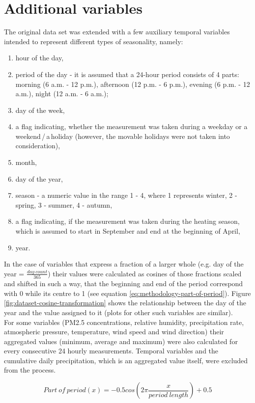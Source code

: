\section{Additional variables}\label{sec:additional-variables}
The original data set was extended with a few auxiliary temporal variables intended to represent different types of seasonality, namely:
\begin{enumerate}
    \item hour of the day,
    \item period of the day - it is assumed that a 24-hour period consists of 4 parts: morning (6 a.m. - 12 p.m.), afternoon (12 p.m. - 6 p.m.), evening (6 p.m. - 12 a.m.), night (12 a.m. - 6 a.m.);
    \item day of the week,
    \item a flag indicating, whether the measurement was taken during a weekday or a weekend\,/\,a\,holiday (however, the movable holidays were not taken into consideration),
    \item month,
    \item day of the year,
    \item season - a numeric value in the range 1 - 4, where 1 represents winter, 2 - spring, 3 - summer, 4 - autumn,
    \item a flag indicating, if the measurement was taken during the heating season, which is assumed to start in September and end at the beginning of April,
    \item year.
\end{enumerate}
In the case of variables that express a fraction of a larger whole (e.g. day of the year = $\frac{day\  count}{365}$) their values were calculated as cosines of those fractions scaled and shifted in such a way, that the beginning and end of the period correspond with 0 while its centre to 1 (see equation \ref{eq:methodology-part-of-period}). Figure \ref{fig:dataset-cosine-transformation} shows the relationship between the day of the year and the value assigned to it (plots for other such variables are similar).
\\
For some variables (PM2.5 concentrations, relative humidity, precipitation rate, atmospheric pressure, temperature, wind speed and wind direction) their aggregated values (minimum, average and maximum) were also calculated for every consecutive 24 hourly measurements. Temporal variables and the cumulative daily precipitation, which is an aggregated value itself, were excluded from the process.

\begin{equation} \label{eq:methodology-part-of-period}
{Part\ of\ period}(x) = -0.5 cos(2 \pi \frac{x}{period\ length}) + 0.5
\end{equation}

